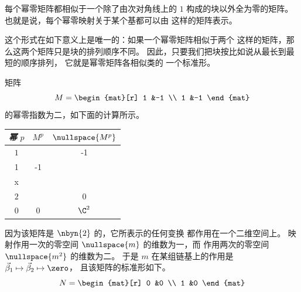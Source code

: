 \begin{corollary} \label{cor:NilpotentMatCanonForm}
每个幂零矩阵都相似于一个除了由次对角线上的
$1$ 构成的块以外全为零的矩阵。
也就是说，每个幂零映射关于某个基都可以由
这样的矩阵表示。
\end{corollary}

这个形式在如下意义上是唯一的：如果一个幂零矩阵相似于两个
这样的矩阵，那么这两个矩阵只是块的排列顺序不同。
因此，只要我们把块按比如说从最长到最短的顺序排列，
它就是幂零矩阵各相似类的
一个标准形。

\begin{example}
矩阵
\begin{equation*}
  M=\begin{mat}[r]
      1  &-1  \\
      1  &-1
    \end{mat}
\end{equation*}
的幂零指数为二，如下面的计算所示。
\begin{center}
  \begin{tabular}{c|cc}
    \multicolumn{1}{c}{\textit{幂} \( p \)}  &\( M^p \)  &\( \nullspace{M^p}  \)   \\
    \hline
    \( 1 \)
    &\(
       M=\matrixvenlarge{\begin{mat}[r]
         1  &-1  \\
         1  &-1
       \end{mat}}  \)
    &\( \set{\matrixvenlarge{\colvec{x \\ x}}\suchthat
                               x\in\C}  \)   \\
    \( 2 \)
    &\(  M^2=\matrixvenlarge{\begin{mat}[r]
         0  &0   \\
         0  &0
       \end{mat}}  \)
    &\( \C^2  \)
  \end{tabular}
\end{center}
因为该矩阵是 $\nbyn{2}$ 的，它所表示的任何变换
都作用在一个二维空间上。
映射作用一次的零空间
$\nullspace{m}$ 的维数为一，而
作用两次的零空间 $\nullspace{m^2}$ 的维数为二。
于是 $m$ 在某组链基上的作用是
$\vec{\beta}_1\mapsto\vec{\beta}_2\mapsto\zero$，
且该矩阵的标准形如下。
\begin{equation*}
  N=\begin{mat}[r]
    0  &0  \\
    1  &0
  \end{mat}
\end{equation*}


\end{example}
